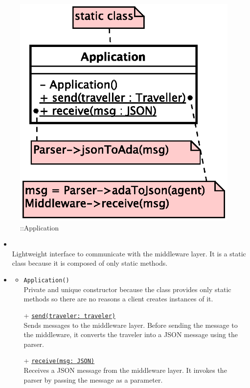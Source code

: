 \begin{figure}[h]
\centering
\includegraphics[scale=0.6,keepaspectratio]{images/solution/app/backend/application.eps}
\caption{\pInterface::Application}
\label{fig:sd-app-application}
\end{figure}
\FloatBarrier
\begin{itemize}
  \item \textbf{\descr} \\
    Lightweight interface to communicate with the middleware layer.
    It is a static class because it is composed of only static methods.
  \item \textbf{\ops}
  \begin{itemize}
   \item \texttt{Application()} \\
   Private and unique constructor because the class provides only static methods 
    so there are no reasons a client creates instances of it.
    \item[+] \texttt{\underline{send(traveler: traveler)}} \\
    Sends messages to the middleware layer. Before sending the message to the
    middleware, it converts the traveler into a JSON message using the parser.
    \item[+] \texttt{\underline{receive(msg: JSON)}} \\
    Receives a JSON message from the middleware layer. It invokes the parser by
    passing the message as a parameter.
  \end{itemize}
\end{itemize}
